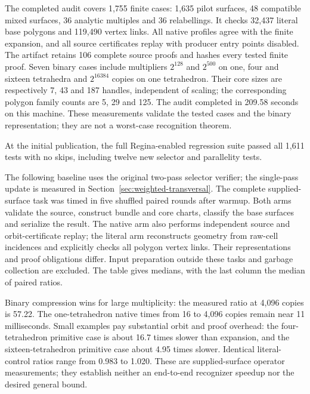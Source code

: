 The completed audit covers 1,755 finite cases: 1,635 pilot surfaces,
48 compatible mixed surfaces, 36 analytic multiples and 36 relabellings.
It checks 32,437 literal base polygons and 119,490 vertex links. All native
profiles agree with the finite expansion, and all source certificates replay
with producer entry points disabled. The artifact retains 106 complete
source proofs and hashes every tested finite proof. Seven binary cases
include multipliers $2^{128}$ and $2^{500}$ on one, four and sixteen tetrahedra and
$2^{16384}$ copies on one tetrahedron. Their core sizes are respectively
7, 43 and 187 handles, independent of scaling; the corresponding polygon
family counts are 5, 29 and 125. The audit completed in 209.58 seconds on
this machine. These measurements validate the tested cases and the binary
representation; they are not a worst-case recognition theorem.

At the initial publication, the full Regina-enabled regression suite passed
all 1,611 tests with no skips, including twelve new selector and parallelity
tests.

The following baseline uses the original two-pass selector verifier; the
single-pass update is measured in Section~\ref{sec:weighted-transversal}.
The complete supplied-surface task was timed in five shuffled paired rounds
after warmup. Both arms validate the source, construct bundle and core charts,
classify the base surfaces and serialize the result. The native arm also
performs independent source and orbit-certificate replay; the literal arm
reconstructs geometry from raw-cell incidences and explicitly checks all
polygon vertex links. Their representations and proof obligations differ.
Input preparation outside these tasks and garbage collection are excluded.
The table gives medians, with the last column the median of paired ratios.



Binary compression wins for large multiplicity: the measured ratio at
4,096 copies is 57.22. The one-tetrahedron native times from 16 to 4,096
copies remain near 11 milliseconds. Small examples pay substantial orbit
and proof overhead: the four-tetrahedron primitive case is about 16.7 times
slower than expansion, and the sixteen-tetrahedron primitive case about
4.95 times slower. Identical literal-control ratios range from 0.983 to
1.020. These are supplied-surface operator measurements; they establish
neither an end-to-end recognizer speedup nor the desired general bound.
